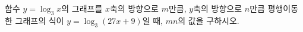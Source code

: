 함수 $y=\log_3 x$의 그래프를 $x$축의 방향으로 $m$만큼, $y$축의 방향으로 $n$만큼 평행이동한 그래프의 식이 $y=\log_3 (27x+9)$일 때, $mn$의 값을 구하시오.
